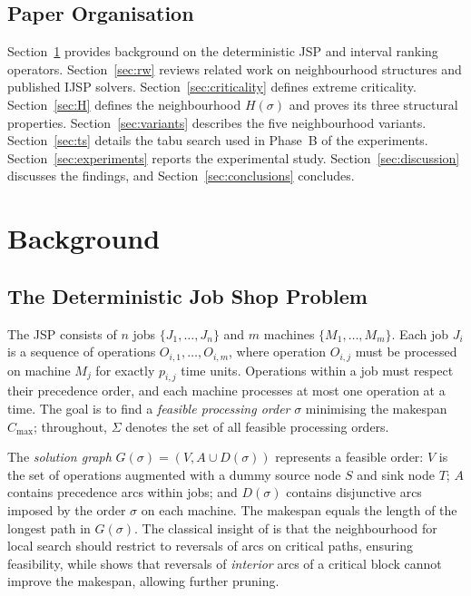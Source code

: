 \documentclass[preprint,12pt]{elsarticle}
\begin{document}
\subsection{Paper Organisation}
\label{sec:organisation}
Section~\ref{sec:background} provides background on the deterministic JSP and interval ranking operators. Section~\ref{sec:rw} reviews related work on neighbourhood structures and published IJSP solvers. Section~\ref{sec:criticality} defines extreme criticality. Section~\ref{sec:H} defines the neighbourhood $H(\sigma)$ and proves its three structural properties. Section~\ref{sec:variants} describes the five neighbourhood variants. Section~\ref{sec:ts} details the tabu search used in Phase~B of the experiments. Section~\ref{sec:experiments} reports the experimental study. Section~\ref{sec:discussion} discusses the findings, and Section~\ref{sec:conclusions} concludes.


\section{Background}
\label{sec:background}

\subsection{The Deterministic Job Shop Problem}
\label{sec:jsp}

The JSP consists of $n$ jobs $\{J_1,\ldots,J_n\}$ and $m$ machines $\{M_1,\ldots,M_m\}$. Each job $J_i$ is a sequence of operations $O_{i,1},\ldots,O_{i,m}$, where operation $O_{i,j}$ must be processed on machine $M_j$ for exactly $p_{i,j}$ time units. Operations within a job must respect their precedence order, and each machine processes at most one operation at a time. The goal is to find a \emph{feasible processing order} $\sigma$ minimising the makespan $C_{\max}$; throughout, $\Sigma$ denotes the set of all feasible processing orders.

The \emph{solution graph} $G(\sigma) = (V, A \cup D(\sigma))$ represents a feasible order: $V$ is the set of operations augmented with a dummy source node $S$ and sink node $T$; $A$ contains precedence arcs within jobs; and $D(\sigma)$ contains disjunctive arcs imposed by the order $\sigma$ on each machine. The makespan equals the length of the longest path in $G(\sigma)$. The classical insight of \cite{vanLaarhoven1992} is that the neighbourhood for local search should restrict to reversals of arcs on critical paths, ensuring feasibility, while \cite{Nowicki1996} shows that reversals of \emph{interior} arcs of a critical block cannot improve the makespan, allowing further pruning.
\end{document}
